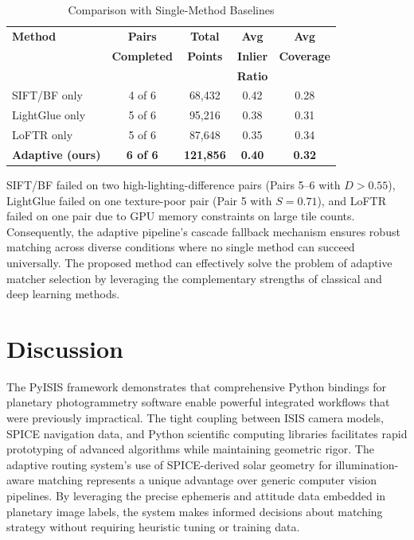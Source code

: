 \documentclass[lettersize,journal]{IEEEtran}
\newcommand{\pyisis}{PyISIS}
\begin{document}
\begin{table}[htbp]
\caption{Comparison with Single-Method Baselines}
\label{tab:baselines}
\centering
\begin{tabular}{@{}lcccc@{}}
\toprule
\textbf{Method} & \textbf{Pairs} & \textbf{Total} & \textbf{Avg} & \textbf{Avg} \\
 & \textbf{Completed} & \textbf{Points} & \textbf{Inlier} & \textbf{Coverage} \\
 &  &  & \textbf{Ratio} &  \\
\midrule
SIFT/BF only & 4 of 6 & 68,432 & 0.42 & 0.28 \\
LightGlue only & 5 of 6 & 95,216 & 0.38 & 0.31 \\
LoFTR only & 5 of 6 & 87,648 & 0.35 & 0.34 \\
\textbf{Adaptive (ours)} & \textbf{6 of 6} & \textbf{121,856} & \textbf{0.40} & \textbf{0.32} \\
\bottomrule
\end{tabular}
\end{table}

SIFT/BF failed on two high-lighting-difference pairs (Pairs 5--6 with $D > 0.55$), LightGlue failed on one texture-poor pair (Pair 5 with $S = 0.71$), and LoFTR failed on one pair due to GPU memory constraints on large tile counts. Consequently, the adaptive pipeline's cascade fallback mechanism ensures robust matching across diverse conditions where no single method can succeed universally. The proposed method can effectively solve the problem of adaptive matcher selection by leveraging the complementary strengths of classical and deep learning methods.


\section{Discussion}\label{sec:discussion}

The \pyisis{} framework demonstrates that comprehensive Python bindings for planetary photogrammetry software enable powerful integrated workflows that were previously impractical. The tight coupling between ISIS camera models, SPICE navigation data, and Python scientific computing libraries facilitates rapid prototyping of advanced algorithms while maintaining geometric rigor. The adaptive routing system's use of SPICE-derived solar geometry for illumination-aware matching represents a unique advantage over generic computer vision pipelines. By leveraging the precise ephemeris and attitude data embedded in planetary image labels, the system makes informed decisions about matching strategy without requiring heuristic tuning or training data.
\end{document}
